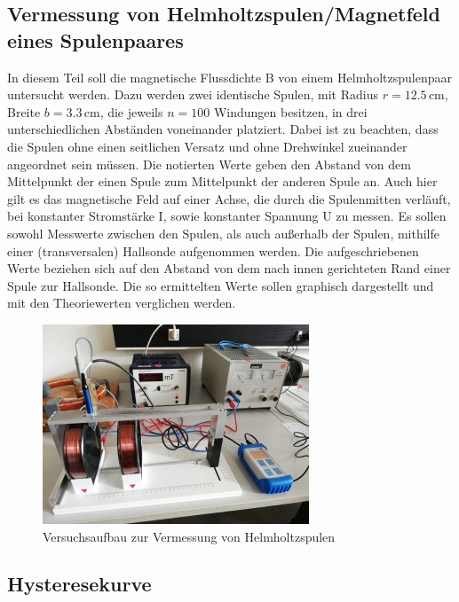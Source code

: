\subsection{Vermessung von Helmholtzspulen/Magnetfeld eines Spulenpaares}

In diesem Teil soll die magnetische Flussdichte B von einem Helmholtzspulenpaar untersucht werden.
Dazu werden zwei identische Spulen, mit Radius $r = 12.5\, \si{\cm}$, Breite $b = 3.3\, \si{\centi\meter}$, die
jeweils $n = 100$ Windungen besitzen, in drei unterschiedlichen Abständen voneinander platziert. Dabei ist zu beachten,
dass die Spulen ohne einen seitlichen Versatz und ohne Drehwinkel zueinander angeordnet sein müssen.
Die notierten Werte geben den Abstand von dem Mittelpunkt der einen Spule zum Mittelpunkt der anderen Spule an. 
Auch hier gilt es das magnetische Feld auf einer Achse, die durch die Spulenmitten verläuft, bei konstanter
Stromstärke I, sowie konstanter Spannung U zu messen. Es sollen sowohl Messwerte zwischen den Spulen, als auch 
außerhalb der Spulen, mithilfe einer (transversalen) Hallsonde aufgenommen werden. Die aufgeschriebenen 
Werte beziehen sich auf den Abstand von dem nach innen gerichteten Rand einer Spule zur Hallsonde.
Die so ermittelten Werte sollen graphisch dargestellt und mit den Theoriewerten verglichen werden.

\begin{figure}[H]
    \centering
    \includegraphics{Helmholtzspule.jpg}
    \caption{Versuchsaufbau zur Vermessung von Helmholtzspulen}
    \label{Helmholtzspulen}
\end{figure}

\subsection{Hysteresekurve}

